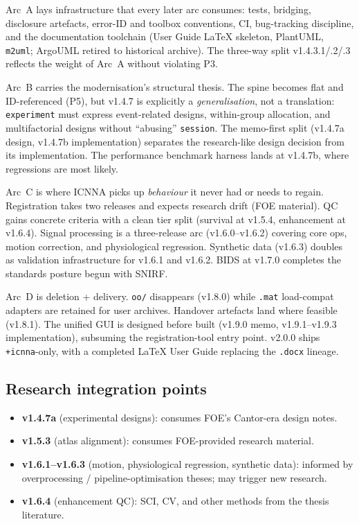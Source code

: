\documentclass[11pt,a4paper]{article}
\begin{document}
Arc~A lays infrastructure that every later arc consumes: tests, bridging, disclosure artefacts, error-ID and toolbox conventions, CI, bug-tracking discipline, and the documentation toolchain (User Guide LaTeX skeleton, PlantUML, \texttt{m2uml}; ArgoUML retired to historical archive). The three-way split v1.4.3.1/.2/.3 reflects the weight of Arc~A without violating P3.

Arc~B carries the modernisation's structural thesis. The spine becomes flat and ID-referenced (P5), but v1.4.7 is explicitly a \emph{generalisation}, not a translation: \texttt{experiment} must express event-related designs, within-group allocation, and multifactorial designs without ``abusing'' \texttt{session}. The memo-first split (v1.4.7a design, v1.4.7b implementation) separates the research-like design decision from its implementation. The performance benchmark harness lands at v1.4.7b, where regressions are most likely.

Arc~C is where ICNNA picks up \emph{behaviour} it never had or needs to regain. Registration takes two releases and expects research drift (FOE material). QC gains concrete criteria with a clean tier split (survival at v1.5.4, enhancement at v1.6.4). Signal processing is a three-release arc (v1.6.0--v1.6.2) covering core ops, motion correction, and physiological regression. Synthetic data (v1.6.3) doubles as validation infrastructure for v1.6.1 and v1.6.2. BIDS at v1.7.0 completes the standards posture begun with SNIRF.

Arc~D is deletion + delivery. \texttt{oo/} disappears (v1.8.0) while \texttt{.mat} load-compat adapters are retained for user archives. Handover artefacts land where feasible (v1.8.1). The unified GUI is designed before built (v1.9.0 memo, v1.9.1--v1.9.3 implementation), subsuming the registration-tool entry point. v2.0.0 ships \texttt{+icnna}-only, with a completed LaTeX User Guide replacing the \texttt{.docx} lineage.

\subsection{Research integration points}

\begin{itemize}
    \item \textbf{v1.4.7a} (experimental designs): consumes FOE's Cantor-era design notes.
    \item \textbf{v1.5.3} (atlas alignment): consumes FOE-provided research material.
    \item \textbf{v1.6.1--v1.6.3} (motion, physiological regression, synthetic data): informed by overprocessing / pipeline-optimisation theses; may trigger new research.
    \item \textbf{v1.6.4} (enhancement QC): SCI, CV, and other methods from the thesis literature.
\end{itemize}
\end{document}
